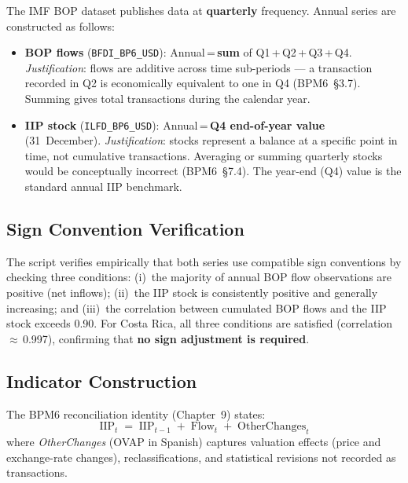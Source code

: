 \documentclass[11pt, a4paper]{article}
\begin{document}
The IMF BOP dataset publishes data at \textbf{quarterly} frequency.
Annual series are constructed as follows:

\begin{itemize}[leftmargin=1.5em, itemsep=2pt]
    \item \textbf{BOP flows} (\texttt{BFDI\_BP6\_USD}):
          Annual\,=\,\textbf{sum} of Q1\,+\,Q2\,+\,Q3\,+\,Q4.
          \textit{Justification}: flows are additive across time
          sub-periods — a transaction recorded in Q2 is economically
          equivalent to one in Q4 (BPM6~§3.7). Summing gives total
          transactions during the calendar year.

    \item \textbf{IIP stock} (\texttt{ILFD\_BP6\_USD}):
          Annual\,=\,\textbf{Q4 end-of-year value} (31~December).
          \textit{Justification}: stocks represent a balance at a
          specific point in time, not cumulative transactions.
          Averaging or summing quarterly stocks would be conceptually
          incorrect (BPM6~§7.4). The year-end (Q4) value is the
          standard annual IIP benchmark.
\end{itemize}

\subsection{Sign Convention Verification}

The script verifies empirically that both series use compatible sign
conventions by checking three conditions: (i)~the majority of annual
BOP flow observations are positive (net inflows); (ii)~the IIP stock
is consistently positive and generally increasing; and
(iii)~the correlation between cumulated BOP flows and the IIP stock
exceeds 0.90. For Costa Rica, all three conditions are satisfied
(correlation\,$\approx$\,0.997), confirming that \textbf{no sign
adjustment is required}.

\subsection{Indicator Construction}

The BPM6 reconciliation identity (Chapter~9) states:
\[
    \text{IIP}_t \;=\; \text{IIP}_{t-1}
                 \;+\; \text{Flow}_t
                 \;+\; \text{OtherChanges}_t
\]
where \emph{OtherChanges} (OVAP in Spanish) captures valuation
effects (price and exchange-rate changes), reclassifications, and
statistical revisions not recorded as transactions.
\end{document}
